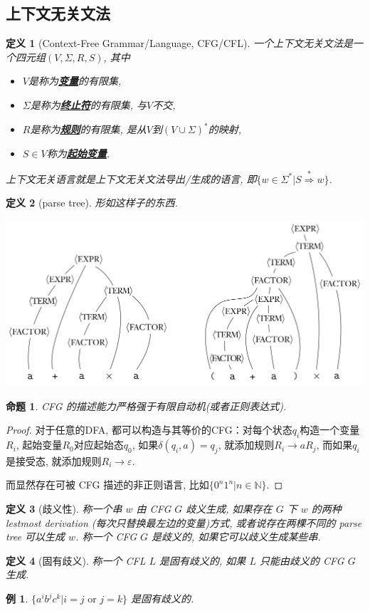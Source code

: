 \documentclass[8pt]{article}
\theoremstyle{compact}
\newtheorem{definition}{定义}[section]
\newtheorem{proposition}{命题}[section]
\newtheorem{example}{例}[section]
\def\obj#1{\textbf{\uline{#1}}}
\begin{document}
\subsection{上下文无关文法}
\begin{definition}[Context-Free Grammar/Language, CFG/CFL]
	一个上下文无关文法是一个四元组$(V, \Sigma, R, S)$, 其中
	\begin{itemize}
		\item $V$是称为\obj{变量}的有限集, 
		\item $\Sigma$是称为\obj{终止符}的有限集, 与$V$不交, 
		\item $R$是称为\obj{规则}的有限集, 是从$V$到$(V \cup \Sigma)^*$的映射, 
		\item $S \in V$称为\obj{起始变量}. 
	\end{itemize}

	上下文无关语言就是上下文无关文法导出/生成的语言, 即$\{w \in \Sigma^* | S \overset{*}{\Rightarrow} w\}$. 
\end{definition}
\begin{definition}[parse tree]
	形如这样子的东西.
	\begin{center}
		\includegraphics*[scale=0.4]{pic/parse_tree.png}	
	\end{center}
\end{definition}
\begin{proposition}
	CFG 的描述能力严格强于有限自动机(或者正则表达式). 
\end{proposition}
\begin{proof}
	对于任意的DFA, 都可以构造与其等价的CFG：对每个状态$q_i$构造一个变量$R_i$, 起始变量$R_0$对应起始态$q_0$, 如果$\delta(q_i, a) = q_j$, 就添加规则$R_i \to aR_j$, 而如果$q_i$是接受态, 就添加规则$R_i \to \varepsilon$. 

	而显然存在可被 CFG 描述的非正则语言, 比如$\{0^n1^n | n \in \mathbb N\}$. 
\end{proof}
\begin{definition}[歧义性]
	称一个串 $w$ 由 CFG $G$ 歧义生成, 如果存在 $G$ 下 $w$ 的两种 lestmost derivation (每次只替换最左边的变量)方式, 或者说存在两棵不同的 parse tree 可以生成 $w$. 称一个 CFG $G$ 是歧义的, 如果它可以歧义生成某些串.
\end{definition}
\begin{definition}[固有歧义]
	称一个 CFL $L$ 是固有歧义的, 如果 $L$ 只能由歧义的 CFG $G$ 生成.
\end{definition}
\begin{example}
	$\{a^ib^jc^k | i = j \textrm{ or } j = k\}$ 是固有歧义的.
\end{example}
\end{document}
